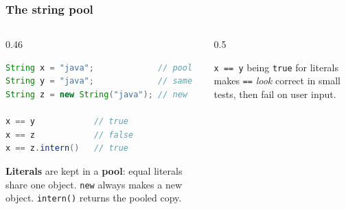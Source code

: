 \documentclass[aspectratio=169,10pt,compress]{beamer}
\begin{document}
\begin{frame}[t,fragile] \frametitle{The string pool}
  \begin{columns}[T]
    \begin{column}{0.46\textwidth}


\begin{lstlisting}[style=codesnippet, language=Java]
String x = "java";             // pool
String y = "java";             // same
String z = new String("java"); // new

x == y            // true
x == z            // false
x == z.intern()   // true
\end{lstlisting}



      \small \textbf{Literals} are kept in a \textbf{pool}: equal literals share one object.
      \texttt{new} always makes a new object. \texttt{intern()} returns the pooled copy.
    \end{column}
    \begin{column}{0.5\textwidth}
      \begin{center}
      \end{center}
      \small {} \texttt{x == y} being \texttt{true} for literals
      makes \texttt{==} \emph{look} correct in small tests, then fail on user input.
    \end{column}
  \end{columns}
\end{frame}
\end{document}
